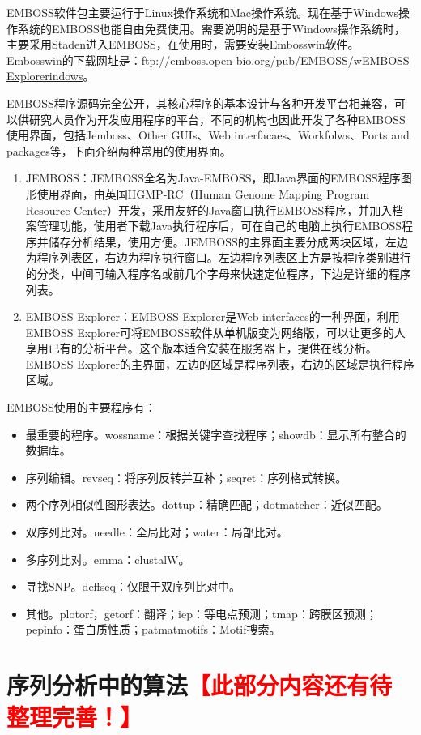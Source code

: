 \documentclass[11pt,a4paper,twoside]{book}
\begin{document}
EMBOSS软件包主要运行于Linux操作系统和Mac操作系统。现在基于Windows操作系统的EMBOSS也能自由免费使用。需要说明的是基于Windows操作系统时，主要采用Staden进入EMBOSS，在使用时，需要安装Embosswin软件。Embosswin的下载网址是：\href{ftp://emboss.open-bio.org/pub/EMBOSS/wEMBOSS Explorerindows}{ftp://emboss.open-bio.org/pub/EMBOSS/wEMBOSS Explorerindows}。

EMBOSS程序源码完全公开，其核心程序的基本设计与各种开发平台相兼容，可以供研究人员作为开发应用程序的平台，不同的机构也因此开发了各种EMBOSS使用界面，包括Jemboss、Other GUIs、Web interfacaes、Workfolws、Ports and packages等，下面介绍两种常用的使用界面。

\begin{enumerate}
  \item JEMBOSS：JEMBOSS全名为Java-EMBOSS，即Java界面的EMBOSS程序图形使用界面，由英国HGMP-RC（Human Genome Mapping Program Resource Center）开发，采用友好的Java窗口执行EMBOSS程序，并加入档案管理功能，使用者下载Java执行程序后，可在自己的电脑上执行EMBOSS程序并储存分析结果，使用方便。JEMBOSS的主界面主要分成两块区域，左边为程序列表区，右边为程序执行窗口。左边程序列表区上方是按程序类别进行的分类，中间可输入程序名或前几个字母来快速定位程序，下边是详细的程序列表。
  \item EMBOSS Explorer：EMBOSS Explorer是Web interfaces的一种界面，利用EMBOSS Explorer可将EMBOSS软件从单机版变为网络版，可以让更多的人享用已有的分析平台。这个版本适合安装在服务器上，提供在线分析。EMBOSS Explorer的主界面，左边的区域是程序列表，右边的区域是执行程序区域。
\end{enumerate}

EMBOSS使用的主要程序有：
\begin{itemize}
  \item 最重要的程序。wossname：根据关键字查找程序；showdb：显示所有整合的数据库。
  \item 序列编辑。revseq：将序列反转并互补；seqret：序列格式转换。
  \item 两个序列相似性图形表达。dottup：精确匹配；dotmatcher：近似匹配。
  \item 双序列比对。needle：全局比对；water：局部比对。
  \item 多序列比对。emma：clustalW。
  \item 寻找SNP。deffseq：仅限于双序列比对中。
  \item 其他。plotorf，getorf：翻译；iep：等电点预测；tmap：跨膜区预测；pepinfo：蛋白质性质；patmatmotifs：Motif搜索。
\end{itemize}

\section{序列分析中的算法\textcolor{red}{【此部分内容还有待整理完善！】}}
\end{document}
